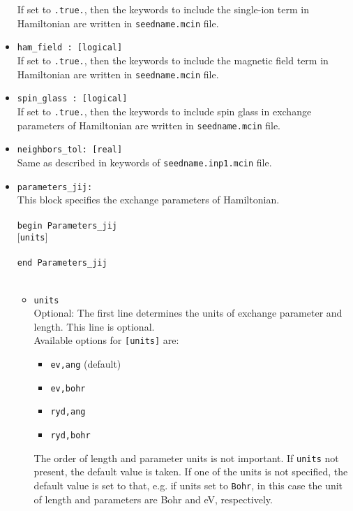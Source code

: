 \documentclass[10pt]{report}
\begin{document}
\begin{itemize}
If set to {\tt .true.}, then the keywords to include the single-ion term in Hamiltonian
 are written in {\tt seedname.mcin} file.
\item {\tt ham\_field  : [logical]}\\
If set to {\tt .true.}, then the keywords to include the magnetic field term in Hamiltonian  
 are written in {\tt seedname.mcin} file.
\item {\tt spin\_glass  : [logical]}\\
If set to {\tt .true.}, then the keywords to include spin glass in exchange parameters of Hamiltonian 
 are written in {\tt seedname.mcin} file.
\item {\tt neighbors\_tol: [real]}                 \\
Same as described in keywords of {\tt seedname.inp1.mcin} file.
\item {\tt parameters\_jij: }                  \\
This block specifies the exchange parameters of Hamiltonian.\\\\
{\tt begin Parameters\_jij} \\
     \hspace*{0.5cm}$[${\tt units}$]$\\
\hspace*{0.5cm}{\tt    type1:type2:shell:Jij\_param!:sigma!:distance}\\
{\tt end Parameters\_jij}\\\\
\begin{itemize} [label=$\diamond$]
\item {{\tt units}}\\ 
Optional: The first line determines the units of exchange parameter and length. This line is optional.\\
Available options for {\tt [units]} are:
\begin{itemize} [label=\adfhalfrightarrowhead]
\item {\tt ev,ang} (default)
\item {\tt ev,bohr}
\item {\tt ryd,ang}
\item {\tt ryd,bohr}
\end{itemize}
The order of length and parameter units is not important.
If {\tt units} not present, the default value is taken.
If one of the units is not specified, the default value is set to that,
 e.g. if units set to {\tt Bohr}, in this case the unit of length and 
parameters are Bohr and eV, respectively.\\\\

\end{itemize}
\end{itemize}
\end{document}
